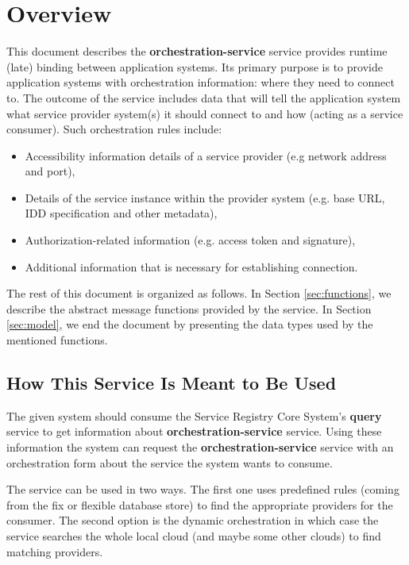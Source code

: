 \documentclass[a4paper]{arrowhead}
\begin{document}
\section{Overview}
\label{sec:overview}
This document describes the \textbf{orchestration-service} service provides runtime (late) binding between application systems. Its primary purpose is to provide application systems with orchestration information: where they need to connect to. The outcome of the service includes data that will tell the application system what service provider system(s) it should connect to and how (acting as a service consumer). Such orchestration rules include:

\begin{itemize}
    \item Accessibility information details of a service provider (e.g network address and port),
    \item Details of the service instance within the provider system (e.g. base URL, IDD specification and other metadata),
    \item Authorization-related information (e.g. access token and signature),
    \item Additional information that is necessary for establishing connection.
\end{itemize}

The rest of this document is organized as follows.
In Section \ref{sec:functions}, we describe the abstract message functions provided by the service.
In Section \ref{sec:model}, we end the document by presenting the data types used by the mentioned functions.

\newpage

\subsection{How This Service Is Meant to Be Used}
The given system should consume the Service Registry Core System's \textbf{query} service to get information about \textbf{orchestration-service} service. Using these information the system can request the \textbf{orchestration-service} service with an orchestration form about the service the system wants to consume. 

The service can be used in two ways. The first one uses predefined rules (coming from the fix or flexible database store) to find the appropriate providers for the consumer. The second option is the dynamic orchestration in which case the service searches the whole local cloud (and maybe some other clouds) to find matching providers.
\end{document}
